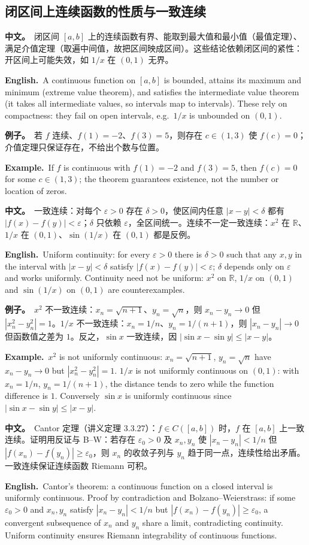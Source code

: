 \documentclass[UTF8,11pt,a4paper]{ctexart}
\newcommand{\R}{\mathbb{R}}
\newcommand{\BOTH}[2]{\par\noindent\textbf{中文。}\ #1\par\noindent\textbf{English.}\ #2\par}
\newcommand{\EX}[2]{\par\noindent\textbf{例子。}\ #1\par\noindent\textbf{Example.}\ #2\par}
\begin{document}
\subsection{闭区间上连续函数的性质与一致连续}
\BOTH{闭区间 $[a,b]$ 上的连续函数有界、能取到最大值和最小值（最值定理）、满足介值定理（取遍中间值，故把区间映成区间）。这些结论依赖闭区间的紧性：开区间上可能失效，如 $1/x$ 在 $(0,1)$ 无界。}{A continuous function on $[a,b]$ is bounded, attains its maximum and minimum (extreme value theorem), and satisfies the intermediate value theorem (it takes all intermediate values, so intervals map to intervals). These rely on compactness: they fail on open intervals, e.g.\ $1/x$ is unbounded on $(0,1)$.}
\EX{若 $f$ 连续、$f(1)=-2$、$f(3)=5$，则存在 $c\in(1,3)$ 使 $f(c)=0$；介值定理只保证存在，不给出个数与位置。}{If $f$ is continuous with $f(1)=-2$ and $f(3)=5$, then $f(c)=0$ for some $c\in(1,3)$; the theorem guarantees existence, not the number or location of zeros.}
\BOTH{一致连续：对每个 $\varepsilon>0$ 存在 $\delta>0$，使区间内任意 $|x-y|<\delta$ 都有 $|f(x)-f(y)|<\varepsilon$；$\delta$ 只依赖 $\varepsilon$，全区间统一。连续不一定一致连续：$x^2$ 在 $\R$、$1/x$ 在 $(0,1)$、$\sin(1/x)$ 在 $(0,1)$ 都是反例。}{Uniform continuity: for every $\varepsilon>0$ there is $\delta>0$ such that any $x,y$ in the interval with $|x-y|<\delta$ satisfy $|f(x)-f(y)|<\varepsilon$; $\delta$ depends only on $\varepsilon$ and works uniformly. Continuity need not be uniform: $x^2$ on $\R$, $1/x$ on $(0,1)$ and $\sin(1/x)$ on $(0,1)$ are counterexamples.}
\EX{$x^2$ 不一致连续：$x_n=\sqrt{n+1}$、$y_n=\sqrt n$，则 $x_n-y_n\to0$ 但 $|x_n^2-y_n^2|=1$。$1/x$ 不一致连续：$x_n=1/n$、$y_n=1/(n+1)$，则 $|x_n-y_n|\to0$ 但函数值之差为 $1$。反之，$\sin x$ 一致连续，因 $|\sin x-\sin y|\le|x-y|$。}{$x^2$ is not uniformly continuous: $x_n=\sqrt{n+1}$, $y_n=\sqrt n$ have $x_n-y_n\to0$ but $|x_n^2-y_n^2|=1$. $1/x$ is not uniformly continuous on $(0,1)$: with $x_n=1/n$, $y_n=1/(n+1)$, the distance tends to zero while the function difference is $1$. Conversely $\sin x$ is uniformly continuous since $|\sin x-\sin y|\le|x-y|$.}
\BOTH{Cantor 定理（讲义定理 3.3.27）：$f\in C([a,b])$ 时，$f$ 在 $[a,b]$ 上一致连续。证明用反证与 B--W：若存在 $\varepsilon_0>0$ 及 $x_n,y_n$ 使 $|x_n-y_n|<1/n$ 但 $|f(x_n)-f(y_n)|\ge\varepsilon_0$，则 $x_n$ 的收敛子列与 $y_n$ 趋于同一点，连续性给出矛盾。一致连续保证连续函数 Riemann 可积。}{Cantor's theorem: a continuous function on a closed interval is uniformly continuous. Proof by contradiction and Bolzano--Weierstrass: if some $\varepsilon_0>0$ and $x_n,y_n$ satisfy $|x_n-y_n|<1/n$ but $|f(x_n)-f(y_n)|\ge\varepsilon_0$, a convergent subsequence of $x_n$ and $y_n$ share a limit, contradicting continuity. Uniform continuity ensures Riemann integrability of continuous functions.}
\end{document}
